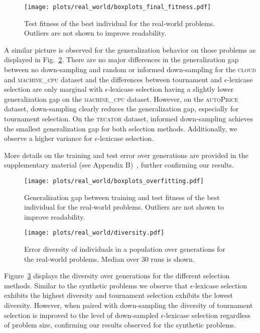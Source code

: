 \documentclass[runningheads]{llncs}
\begin{document}
\begin{figure}
    \centering
    \texttt{[image: plots/real\_world/boxplots\_final\_fitness.pdf]}
    \caption{Test fitness of the best individual for the real-world problems.  Outliers are not shown to improve readability.}
    \label{fig:real_world-test_fitness_boxplots}
\end{figure}

A similar picture is observed for the generalization behavior on those problems as displayed in Fig.~\ref{fig:real_world-overfitting_boxplots}. There are no major differences in the generalization gap between no down-sampling and random or informed down-sampling for the \textsc{cloud} and \textsc{machine\_cpu} dataset and the differences between tournament and $\epsilon$-lexicase selection are only marginal with $\epsilon$-lexicase selection having a slightly lower generalization gap on the \textsc{machine\_cpu} dataset.
However, on the \textsc{autoPrice} dataset, down-sampling clearly reduces the generalization gap, especially for tournament selection. On the \textsc{tecator} dataset, informed down-sampling achieves the smallest generalization gap for both selection methods. Additionally, we observe a higher variance for $\epsilon$-lexicase selection.

More details on the training and test error over generations are provided in the supplementary material (see Appendix B)~\cite{zenodo}, further confirming our results.

\begin{figure}
    \centering
    \texttt{[image: plots/real\_world/boxplots\_overfitting.pdf]}
    \caption{Generalization gap between training and test fitness of the best individual for the real-world problems.  Outliers are not shown to improve readability.}
    \label{fig:real_world-overfitting_boxplots}
\end{figure}


\begin{figure}
    \centering
    \texttt{[image: plots/real\_world/diversity.pdf]}
    \caption{Error diversity of individuals in a population over generations for the real-world problems. Median over 30 runs is shown.}
    \label{fig:real_world-diversity}
\end{figure}

Figure~\ref{fig:real_world-diversity} displays the diversity over generations for the different selection methods. Similar to the synthetic problems we observe that $\epsilon$-lexicase selection exhibits the highest diversity and tournament selection exhibits the lowest diversity. However, when paired with down-sampling the diversity of tournament selection is improved to the level of down-sampled $\epsilon$-lexicase selection regardless of problem size, confirming our results observed for the synthetic problems.
\end{document}
